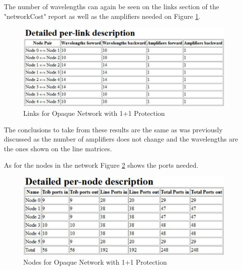%	
%	
	
	The number of wavelengths can again be seen on the links section of the "networkCost" report as well as the amplifiers needed on Figure \ref{networkCost_Report_Links_Opaque11}.
	
	\begin{figure}[h!]
		\centering
		\includegraphics[width=11cm]{networkCost_Report_Links_Opaque11.pdf}	
		\caption{Links for Opaque Network with 1+1 Protection}
		\label{networkCost_Report_Links_Opaque11}								
	\end{figure}	
	
	The conclusions to take from these results are the same as was previously discussed as the number of amplifiers does not change and the wavelengths are the ones shown on the line matrices.
	
	As for the nodes in the network Figure \ref{networkCost_Report_Nodes_Opaque11} shows the ports needed.
	
	\begin{figure}[h!]
		\centering
		\includegraphics[width=11cm]{networkCost_Report_Nodes_Opaque11.pdf}	
		\caption{Nodes for Opaque Network with 1+1 Protection}
		\label{networkCost_Report_Nodes_Opaque11}								
	\end{figure}		
	
